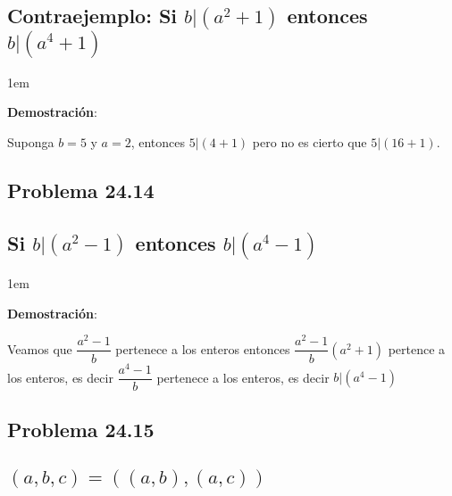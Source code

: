 \documentclass[12pt, fleqn]{article}                             %
\newenvironment{SmallIndentation}[1][0.75em]                    %
    {\begin{adjustwidth}{#1}{}\begin{footnotesize}}                 %
    {\end{footnotesize}\end{adjustwidth}}                           %
\begin{document}
    \subsection*{Contraejemplo: Si $b|(a^2+1)$ entonces $b|(a^4+1)$}

    \begin{SmallIndentation}[1em]
        \textbf{Demostración}:
        
        Suponga $b=5$ y $a=2$, entonces $5|(4+1)$ pero no es cierto que
        $5|(16+1)$.
    \end{SmallIndentation}

    \subsection{Problema 24.14}
    \subsection*{Si $b|(a^2-1)$ entonces $b|(a^4-1)$}

    \begin{SmallIndentation}[1em]
        \textbf{Demostración}:
        

        Veamos que $\dfrac{a^2-1}{b}$ pertenece a los enteros entonces
        $\dfrac{a^2-1}{b}(a^2+1)$ pertence a los enteros, es decir
        $\dfrac{a^4-1}{b}$ pertenece a los enteros, es decir $b|(a^4-1)$
    \end{SmallIndentation}



    \subsection{Problema 24.15}
    \subsection*{$(a,b,c) = ((a,b),(a,c))$}
\end{document}
